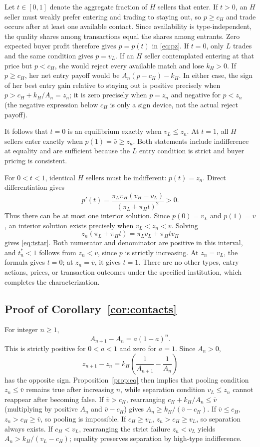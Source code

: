 \documentclass[11pt]{article}
\begin{document}
Let $t\in[0,1]$ denote the aggregate fraction of $H$ sellers that enter. If $t>0$, an $H$ seller must weakly prefer entering and trading to staying out, so $p\geq c_H$ and trade occurs after at least one available contact. Since availability is type-independent, the quality shares among transactions equal the shares among entrants. Zero expected buyer profit therefore gives $p=p(t)$ in \eqref{eq:pz}. If $t=0$, only $L$ trades and the same condition gives $p=v_L$. If an $H$ seller contemplated entering at that price but $p<c_H$, she would reject every available match and lose $k_H>0$. If $p\geq c_H$, her net entry payoff would be $A_n(p-c_H)-k_H$. In either case, the sign of her best entry gain relative to staying out is positive precisely when $p>c_H+k_H/A_n=z_n$; it is zero precisely when $p=z_n$ and negative for $p<z_n$ (the negative expression below $c_H$ is only a sign device, not the actual reject payoff).

It follows that $t=0$ is an equilibrium exactly when $v_L\leq z_n$. At $t=1$, all $H$ sellers enter exactly when $p(1)=\bar v\geq z_n$. Both statements include indifference at equality and are sufficient because the $L$ entry condition is strict and buyer pricing is consistent.

For $0<t<1$, identical $H$ sellers must be indifferent: $p(t)=z_n$. Direct differentiation gives
\[
 p'(t)=\frac{\pi_L\pi_H(v_H-v_L)}{(\pi_L+\pi_Ht)^2}>0.
\]
Thus there can be at most one interior solution. Since $p(0)=v_L$ and $p(1)=\bar v$, an interior solution exists precisely when $v_L<z_n<\bar v$. Solving
\[
 z_n(\pi_L+\pi_Ht)=\pi_Lv_L+\pi_Ht v_H
\]
gives \eqref{eq:tstar}. Both numerator and denominator are positive in this interval, and $t_n^*<1$ follows from $z_n<\bar v$, since $p$ is strictly increasing. At $z_n=v_L$, the formula gives $t=0$; at $z_n=\bar v$, it gives $t=1$. There are no other types, entry actions, prices, or transaction outcomes under the specified institution, which completes the characterization.

\subsection{Proof of Corollary~\ref{cor:contacts}}\label{proof:contacts}
For integer $n\geq1$,
\[
 A_{n+1}-A_n=a(1-a)^n.
\]
This is strictly positive for $0<a<1$ and zero for $a=1$. Since $A_n>0$,
\[
 z_{n+1}-z_n=k_H\left(\frac{1}{A_{n+1}}-\frac{1}{A_n}\right)
\]
has the opposite sign. Proposition~\ref{prop:eq} then implies that pooling condition $z_n\leq\bar v$ remains true after increasing $n$, while separation condition $v_L\leq z_n$ cannot reappear after becoming false. If $\bar v>c_H$, rearranging $c_H+k_H/A_n\leq\bar v$ (multiplying by positive $A_n$ and $\bar v-c_H$) gives $A_n\geq k_H/(\bar v-c_H)$. If $\bar v\leq c_H$, $z_n>c_H\geq\bar v$, so pooling is impossible. If $c_H\geq v_L$, $z_n>c_H\geq v_L$, so separation always exists. If $c_H<v_L$, rearranging the strict failure $z_n<v_L$ yields $A_n>k_H/(v_L-c_H)$; equality preserves separation by high-type indifference.
\end{document}
